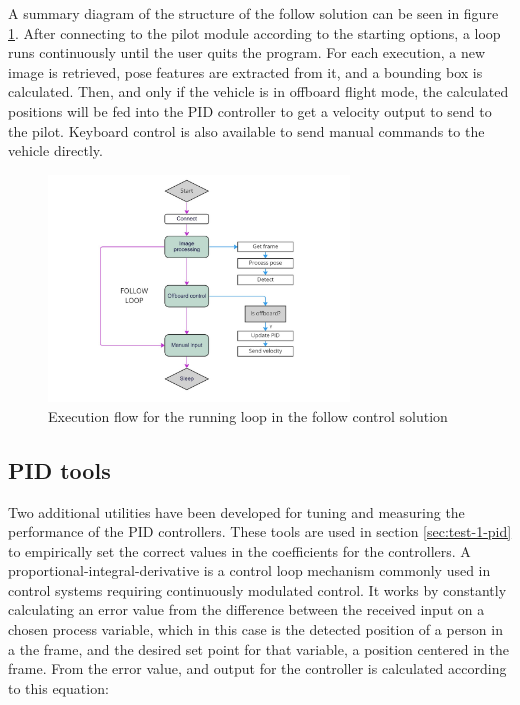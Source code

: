 A summary diagram of the structure of the follow solution can be seen in figure \ref{fig:follow-loop}.
After connecting to the pilot module according to the starting options, a loop runs continuously until the user quits the program.
For each execution, a new image is retrieved, pose features are extracted from it, and a bounding box is calculated.
Then, and only if the vehicle is in offboard flight mode, the calculated positions will be fed into the PID controller to get a velocity output to send to the pilot.
Keyboard control is also available to send manual commands to the vehicle directly.

\begin{figure}
  \centering
  \includegraphics[width=8cm, keepaspectratio]{img/follow-loop.jpg}
  \caption{Execution flow for the running loop in the follow control solution}
  \label{fig:follow-loop}
\end{figure}




\subsection{PID tools}
\label{subsec:pid-tools}

Two additional utilities have been developed for tuning and measuring the performance of the PID controllers.
These tools are used in section \ref{sec:test-1-pid} to empirically set the correct values in the coefficients for the controllers.
A proportional-integral-derivative is a control loop mechanism commonly used in control systems requiring continuously modulated control.
It works by constantly calculating an error value from the difference between the received input on a chosen process variable, which in this case is the detected position of a person in a the frame, and the desired set point for that variable, a position centered in the frame.
From the error value, and output for the controller is calculated according to this equation:

